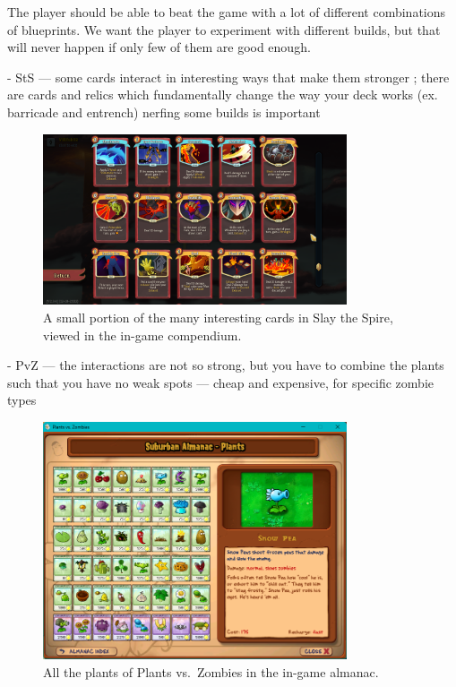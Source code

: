 The player should be able to beat the game with a lot of different combinations of blueprints.
We want the player to experiment with different builds, but that will never happen if only few of them are good enough.

- StS --- some cards interact in interesting ways that make them stronger ; there are cards and relics which fundamentally change the way your deck works (ex. barricade and entrench) nerfing some builds is important

\begin{figure}[htb]
    \centering
    \includegraphics[width=0.8\textwidth]{img/Slay-the-Spire-Compendium.png}
    \caption{A small portion of the many interesting cards in Slay the Spire, viewed in the in-game compendium.}
    \label{fig:slay-the-spire-compendium}
\end{figure}

- PvZ --- the interactions are not so strong, but you have to combine the plants such that you have no weak spots --- cheap and expensive, for specific zombie types

\begin{figure}[htb]
    \centering
    \includegraphics[width=0.8\textwidth]{img/Plants-vs-Zombies-Almanac.png}
    \caption{All the plants of Plants vs.\ Zombies in the in-game almanac.}
    \label{fig:plants-vs-zombies-almanac}
\end{figure}

